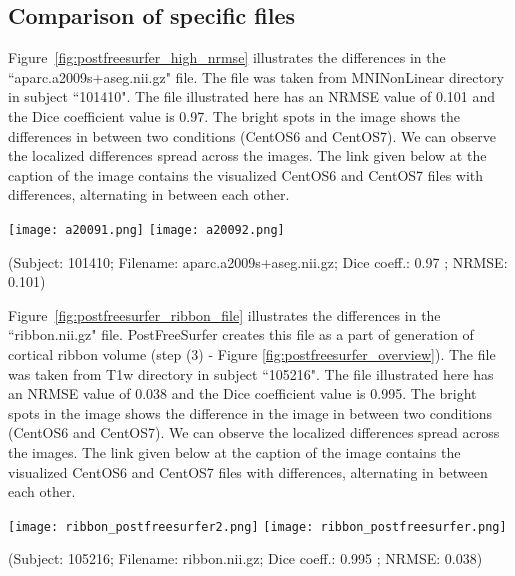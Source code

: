 \subsection{Comparison of specific files}
Figure~\ref{fig:postfreesurfer_high_nrmse} illustrates the differences in the ``aparc.a2009s+aseg.nii.gz" file. The file was taken from MNINonLinear directory in subject ``101410". The file illustrated here has an NRMSE value of 0.101 and the Dice coefficient value is 0.97. The bright spots in the image shows the differences in between two conditions (CentOS6 and CentOS7). We can observe the localized differences spread across the images. The link given below at the caption of the image contains the visualized CentOS6 and CentOS7 files with differences, alternating in between each other.

\begin{center}
\texttt{[image: a20091.png]}%
\texttt{[image: a20092.png]}
\caption*{(Subject: 101410; Filename: aparc.a2009s+aseg.nii.gz; Dice coeff.: 0.97 ; NRMSE: 0.101)}
\label{fig:postfreesurfer_high_nrmse}
\end{center}

Figure~\ref{fig:postfreesurfer_ribbon_file} illustrates the differences in the ``ribbon.nii.gz" file. PostFreeSurfer creates this file as a part of generation of cortical ribbon volume (step (3) - Figure \ref{fig:postfreesurfer_overview}). The file was taken from T1w directory in subject ``105216". The file illustrated here has an NRMSE value of 0.038 and the Dice coefficient value is 0.995. The bright spots in the image shows the difference in the image in between two conditions (CentOS6 and CentOS7). We can observe the localized differences spread across the images. The link given below at the caption of the image contains the visualized CentOS6 and CentOS7 files with differences, alternating in between each other.

\begin{center}
\texttt{[image: ribbon\_postfreesurfer2.png]}%
\texttt{[image: ribbon\_postfreesurfer.png]}
\caption*{(Subject: 105216; Filename: ribbon.nii.gz; Dice coeff.: 0.995 ; NRMSE: 0.038)}
\label{fig:postfreesurfer_ribbon_file}
\end{center}

